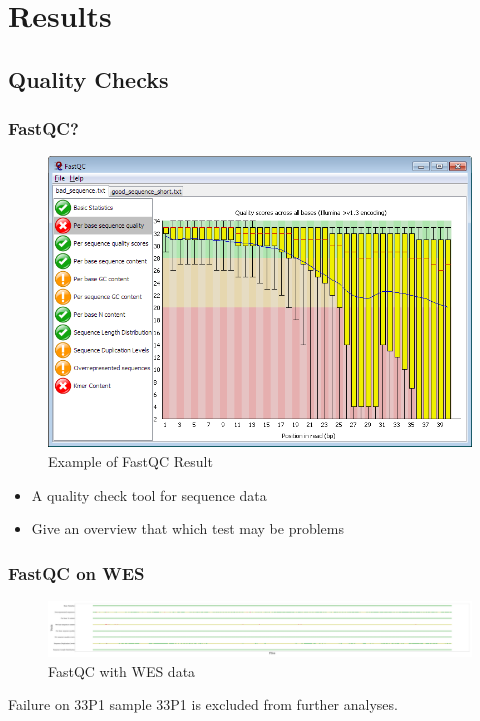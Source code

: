 \documentclass{beamer}
\begin{document}
    \section{Results}
    \subsection{Quality Checks}
    \begin{frame}
        \frametitle{FastQC?}

        \begin{figure}
            \includegraphics[width=0.5 \linewidth]{figures/Workflow/FastQC.png}
            \caption{Example of FastQC Result \protect\cite{fastqc1}}
        \end{figure}

        \begin{itemize}
            \item A quality check tool for sequence data
            \item Give an overview that which test may be problems
        \end{itemize}
    \end{frame}

    \begin{frame}
        \frametitle{FastQC on WES}

        \begin{figure}
            \includegraphics[width=\linewidth]{figures/FastQC/FastQC_WES.pdf}
            \caption{FastQC with WES data}
        \end{figure}

        \begin{alertblock}{Failure on 33P1 sample}
            33P1 is excluded from further analyses.
        \end{alertblock}
    \end{frame}
\end{document}
